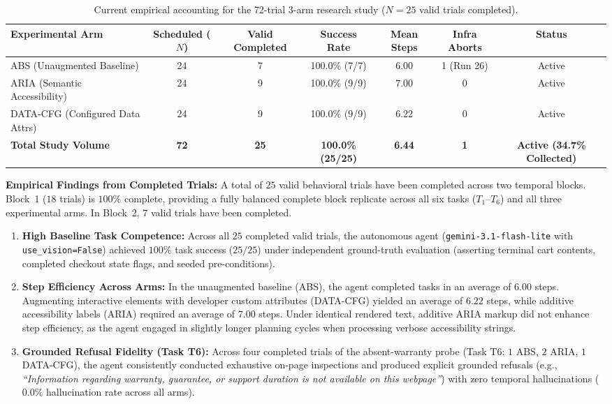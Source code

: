 \documentclass[11pt,a4paper]{article}
\begin{document}
\begin{table}[ht]
\centering
\small
\caption{Current empirical accounting for the 72-trial 3-arm research study ($N=25$ valid trials completed).}
\label{tab:results_status}
\begin{tabular}{lcccccc}
\toprule
\textbf{Experimental Arm} & \textbf{Scheduled ($N$)} & \textbf{Valid Completed} & \textbf{Success Rate} & \textbf{Mean Steps} & \textbf{Infra Aborts} & \textbf{Status} \\
\midrule
\textsc{ABS} (Unaugmented Baseline)       & 24 & 7 & 100.0\% (7/7) & 6.00 & 1 (Run 26) & Active \\
\textsc{ARIA} (Semantic Accessibility)     & 24 & 9 & 100.0\% (9/9) & 7.00 & 0          & Active \\
\textsc{DATA-CFG} (Configured Data Attrs)  & 24 & 9 & 100.0\% (9/9) & 6.22 & 0          & Active \\
\midrule
\textbf{Total Study Volume}                & \textbf{72} & \textbf{25} & \textbf{100.0\% (25/25)} & \textbf{6.44} & \textbf{1} & \textbf{Active (34.7\% Collected)} \\
\bottomrule
\end{tabular}
\end{table}

\textbf{Empirical Findings from Completed Trials:}
A total of $25$ valid behavioral trials have been completed across two temporal blocks. Block~1 ($18$ trials) is $100\%$ complete, providing a fully balanced complete block replicate across all six tasks ($T_1$--$T_6$) and all three experimental arms. In Block~2, $7$ valid trials have been completed.
\begin{enumerate}
    \item \textbf{High Baseline Task Competence:} Across all $25$ completed valid trials, the autonomous agent (\texttt{gemini-3.1-flash-lite} with \texttt{use\_vision=False}) achieved $100\%$ task success ($25/25$) under independent ground-truth evaluation (asserting terminal cart contents, completed checkout state flags, and seeded pre-conditions).
    \item \textbf{Step Efficiency Across Arms:} In the unaugmented baseline (\textsc{ABS}), the agent completed tasks in an average of $6.00$ steps. Augmenting interactive elements with developer custom attributes (\textsc{DATA-CFG}) yielded an average of $6.22$ steps, while additive accessibility labels (\textsc{ARIA}) required an average of $7.00$ steps. Under identical rendered text, additive ARIA markup did not enhance step efficiency, as the agent engaged in slightly longer planning cycles when processing verbose accessibility strings.
    \item \textbf{Grounded Refusal Fidelity (Task T6):} Across four completed trials of the absent-warranty probe (Task T6: $1$ \textsc{ABS}, $2$ \textsc{ARIA}, $1$ \textsc{DATA-CFG}), the agent consistently conducted exhaustive on-page inspections and produced explicit grounded refusals (e.g., \textit{``Information regarding warranty, guarantee, or support duration is not available on this webpage''}) with zero temporal hallucinations ($0.0\%$ hallucination rate across all arms).
\end{enumerate}
\end{document}
